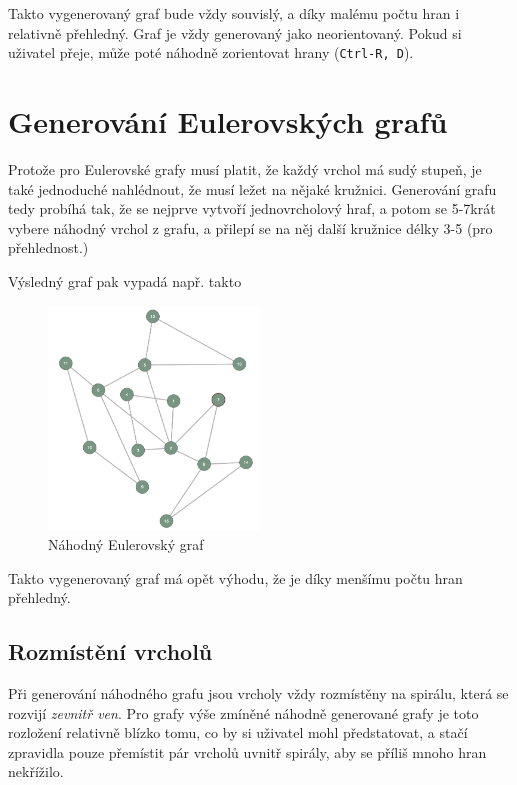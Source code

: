 \documentclass{article}
\def\code#1{\texttt{#1}}
\begin{document}
Takto vygenerovaný graf bude vždy souvislý, a díky malému počtu hran i
relativně přehledný. Graf je vždy generovaný jako neorientovaný. Pokud
si uživatel přeje, může poté náhodně zorientovat hrany (\code{Ctrl-R, D}).

\section{Generování Eulerovských grafů}

Protože pro Eulerovské grafy musí platit, že každý vrchol má sudý
stupeň, je také jednoduché nahlédnout, že musí ležet na nějaké kružnici.
Generování grafu tedy probíhá tak, že se nejprve vytvoří jednovrcholový
hraf, a potom se 5-7krát vybere náhodný vrchol z grafu, a přilepí se na
něj další kružnice délky 3-5 (pro přehlednost.)

Výsledný graf pak vypadá např. takto

\begin{figure}
  \centering
    \includegraphics[width=0.5\textwidth]{LQNxfKa.png}
  \caption{Náhodný Eulerovský graf}
\end{figure}

Takto vygenerovaný graf má opět výhodu, že je díky menšímu počtu hran přehledný.

\subsection{Rozmístění vrcholů}

Při generování náhodného grafu jsou vrcholy vždy rozmístěny na spirálu,
která se rozvijí \emph{zevnitř ven}. Pro grafy výše zmíněné náhodně
generované grafy je toto rozložení relativně blízko tomu, co by si
uživatel mohl předstatovat, a stačí zpravidla pouze přemístit pár
vrcholů uvnitř spirály, aby se příliš mnoho hran nekřížilo.
\end{document}
